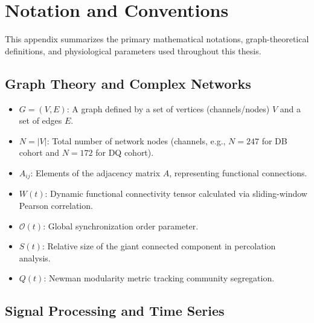 \section{Notation and Conventions}
\label{app:notation}

This appendix summarizes the primary mathematical notations, graph-theoretical definitions, and physiological parameters used throughout this thesis.

\subsection{Graph Theory and Complex Networks}
\lipsum[1-2]

\begin{itemize}
    \item $G = (V, E)$: A graph defined by a set of vertices (channels/nodes) $V$ and a set of edges $E$.
    \item $N = |V|$: Total number of network nodes (channels, e.g., $N = 247$ for DB cohort and $N = 172$ for DQ cohort).
    \item $A_{ij}$: Elements of the adjacency matrix $A$, representing functional connections.
    \item $W(t)$: Dynamic functional connectivity tensor calculated via sliding-window Pearson correlation.
    \item $\mathcal{O}(t)$: Global synchronization order parameter.
    \item $S(t)$: Relative size of the giant connected component in percolation analysis.
    \item $Q(t)$: Newman modularity metric tracking community segregation.
\end{itemize}

\subsection{Signal Processing and Time Series}
\lipsum[3-4]